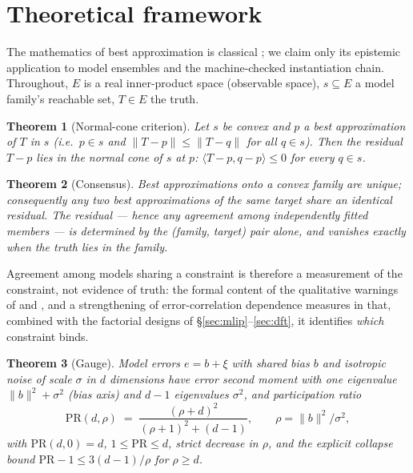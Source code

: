 \documentclass[11pt]{article}
\newtheorem{theorem}{Theorem}
\theoremstyle{remark}
\newcommand{\inn}[2]{\langle #1, #2 \rangle}
\begin{document}
\section{Theoretical framework}
\label{sec:theory}

The mathematics of best approximation is classical
\citep{deutsch2001,kinderlehrer1980}; we claim only its epistemic application
to model ensembles and the machine-checked instantiation chain. Throughout,
$E$ is a real inner-product space (observable space), $s \subseteq E$ a model
family's reachable set, $T \in E$ the truth.

\begin{theorem}[Normal-cone criterion]\label{thm:cone}
Let $s$ be convex and $p$ a best approximation of $T$ in $s$
(i.e.\ $p \in s$ and $\|T-p\| \le \|T-q\|$ for all $q \in s$). Then the
residual $T - p$ lies in the normal cone of $s$ at $p$:
$\inn{T-p}{q-p} \le 0$ for every $q \in s$.
\end{theorem}

\begin{theorem}[Consensus]\label{thm:consensus}
Best approximations onto a convex family are unique; consequently any two best
approximations of the same target share an \emph{identical} residual. The
residual --- hence any agreement among independently fitted members --- is
determined by the (family, target) pair alone, and vanishes exactly when the
truth lies in the family.
\end{theorem}

Agreement among models sharing a constraint is therefore a measurement of the
constraint, not evidence of truth: the formal content of the qualitative
warnings of \citep{parker2011} and \citep{pirtle2010}, and a strengthening of
error-correlation dependence measures \citep{bishop2013} in that, combined
with the factorial designs of \S\ref{sec:mlip}--\ref{sec:dft}, it identifies
\emph{which} constraint binds.

\begin{theorem}[Gauge]\label{thm:gauge}
Model errors $e = b + \xi$ with shared bias $b$ and isotropic noise of scale
$\sigma$ in $d$ dimensions have error second moment with one eigenvalue
$\|b\|^2 + \sigma^2$ (bias axis) and $d{-}1$ eigenvalues $\sigma^2$, and
participation ratio
\[
\mathrm{PR}(d,\rho) \;=\; \frac{(\rho+d)^2}{(\rho+1)^2 + (d-1)},
\qquad \rho = \|b\|^2/\sigma^2 ,
\]
with $\mathrm{PR}(d,0)=d$, $1 \le \mathrm{PR} \le d$, strict decrease in
$\rho$, and the explicit collapse bound
$\mathrm{PR}-1 \le 3(d-1)/\rho$ for $\rho \ge d$.
\end{theorem}
\end{document}
